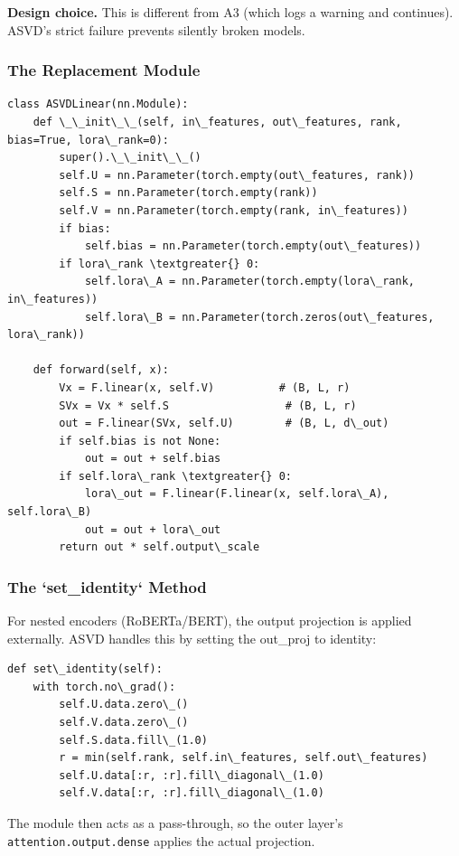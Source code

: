 \textbf{Design choice.} This is different from A3 (which logs a warning and 
continues). ASVD's strict failure prevents silently broken models.

\subsubsection{The Replacement Module}

\begin{lstlisting}
class ASVDLinear(nn.Module):
    def \_\_init\_\_(self, in\_features, out\_features, rank, bias=True, lora\_rank=0):
        super().\_\_init\_\_()
        self.U = nn.Parameter(torch.empty(out\_features, rank))
        self.S = nn.Parameter(torch.empty(rank))
        self.V = nn.Parameter(torch.empty(rank, in\_features))
        if bias:
            self.bias = nn.Parameter(torch.empty(out\_features))
        if lora\_rank \textgreater{} 0:
            self.lora\_A = nn.Parameter(torch.empty(lora\_rank, in\_features))
            self.lora\_B = nn.Parameter(torch.zeros(out\_features, lora\_rank))
    
    def forward(self, x):
        Vx = F.linear(x, self.V)          # (B, L, r)
        SVx = Vx * self.S                  # (B, L, r)
        out = F.linear(SVx, self.U)        # (B, L, d\_out)
        if self.bias is not None:
            out = out + self.bias
        if self.lora\_rank \textgreater{} 0:
            lora\_out = F.linear(F.linear(x, self.lora\_A), self.lora\_B)
            out = out + lora\_out
        return out * self.output\_scale
\end{lstlisting}

\subsubsection{The `set\_identity` Method}

For nested encoders (RoBERTa/BERT), the output projection is applied 
externally. ASVD handles this by setting the out\_proj to identity:

\begin{lstlisting}
def set\_identity(self):
    with torch.no\_grad():
        self.U.data.zero\_()
        self.V.data.zero\_()
        self.S.data.fill\_(1.0)
        r = min(self.rank, self.in\_features, self.out\_features)
        self.U.data[:r, :r].fill\_diagonal\_(1.0)
        self.V.data[:r, :r].fill\_diagonal\_(1.0)
\end{lstlisting}

The module then acts as a pass-through, so the outer layer's 
\texttt{attention.output.dense} applies the actual projection.

